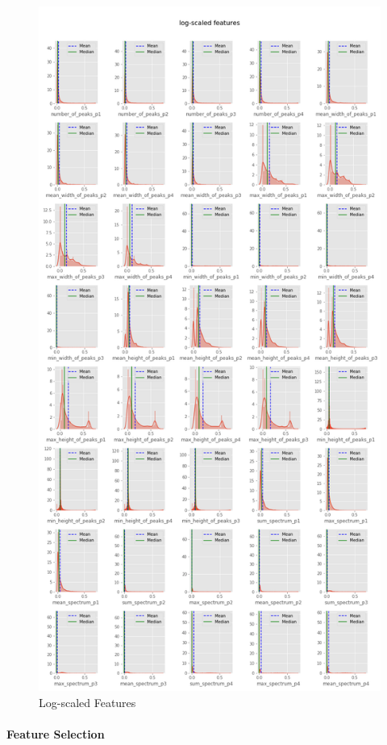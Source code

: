 \documentclass[11pt]{article}
\makeatletter
\def\maxwidth{\ifdim\Gin@nat@width>\linewidth\linewidth
    \else\Gin@nat@width\fi}
\let\Oldincludegraphics\includegraphics
\renewcommand{\includegraphics}[1]{\Oldincludegraphics[width=.8\maxwidth]{#1}}
\makeatother
\begin{document}
\begin{figure}
\centering
\includegraphics{dist_minmax_scaled_log.png}
\caption{Log-scaled Features}
\end{figure}

\hypertarget{feature-selection}{%
\paragraph{Feature Selection}\label{feature-selection}}
\end{document}
